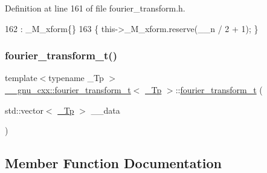 Definition at line 161 of file fourier\+\_\+transform.\+h.


\begin{DoxyCode}
162       : \_M\_xform\{\}
163       \{ this->\_M\_xform.reserve(\_\_n / 2 + 1); \}
\end{DoxyCode}
\mbox{\label{class____gnu__cxx_1_1fourier__transform__t_abb69842c2d297492cc5cd22e4b0ee34e}} 
\subsubsection{\texorpdfstring{fourier\+\_\+transform\+\_\+t()}{fourier\_transform\_t()}\hspace{0.1cm}{\footnotesize\ttfamily [2/2]}}
{\footnotesize\ttfamily template$<$typename \+\_\+\+Tp $>$ \\
\hyperlink{class____gnu__cxx_1_1fourier__transform__t}{\+\_\+\+\_\+gnu\+\_\+cxx\+::fourier\+\_\+transform\+\_\+t}$<$ \hyperlink{namespace____gnu__cxx_a3b19a9c800ca194374ef9172290f7d79}{\+\_\+\+Tp} $>$\+::\hyperlink{class____gnu__cxx_1_1fourier__transform__t}{fourier\+\_\+transform\+\_\+t} (\begin{DoxyParamCaption}\item[{std\+::vector$<$ \hyperlink{namespace____gnu__cxx_a3b19a9c800ca194374ef9172290f7d79}{\+\_\+\+Tp} $>$}]{\+\_\+\+\_\+data }\end{DoxyParamCaption})}



\subsection{Member Function Documentation}
\mbox{\label{class____gnu__cxx_1_1fourier__transform__t_a1b39e5c1042bdb5b60d4f833d5661ed8}} 
